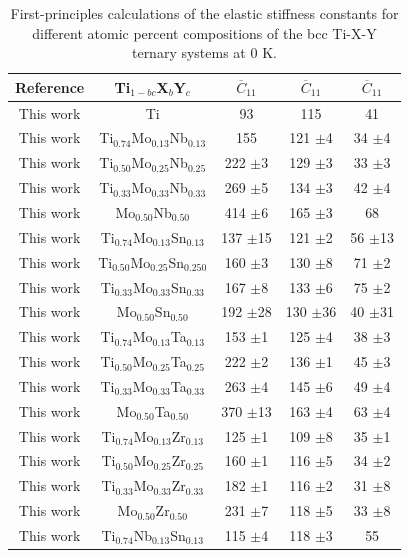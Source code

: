 \newpage
\begin{longtable}[H]{ c c c c c}
	\caption{First-principles calculations of the elastic stiffness constants for different atomic percent compositions of the bcc Ti-X-Y ternary systems at 0 K.} 	\label{Ch6-table:tixyecijdata} \\
	\hline
	Reference & Ti$_{1-bc}$X$_b$Y$_c$ & $\overline{C}_{11}$ & $\overline{C}_{11}$ & $\overline{C}_{11}$ \\
	\hline
	\endhead
	\hline
	\endfoot
	This work & Ti & 93 & 115 & 41 \\
	This work & Ti$_{0.74}$Mo$_{0.13}$Nb$_{0.13}$ & 155 & 121 $\pm$4 & 34 $\pm$4 \\
	This work & Ti$_{0.50}$Mo$_{0.25}$Nb$_{0.25}$ & 222 $\pm$3 & 129 $\pm$3 & 33 $\pm$3 \\
	This work & Ti$_{0.33}$Mo$_{0.33}$Nb$_{0.33}$ & 269 $\pm$5 & 134 $\pm$3 & 42 $\pm$4 \\
	This work & Mo$_{0.50}$Nb$_{0.50}$ & 414 $\pm$6 & 165 $\pm$3 & 68 \\
	This work & Ti$_{0.74}$Mo$_{0.13}$Sn$_{0.13}$ & 137 $\pm$15 & 121 $\pm$2 & 56 $\pm$13 \\
	This work & Ti$_{0.50}$Mo$_{0.25}$Sn$_{0.250}$ & 160 $\pm$3 & 130 $\pm$8 & 71 $\pm$2 \\
	This work & Ti$_{0.33}$Mo$_{0.33}$Sn$_{0.33}$ & 167 $\pm$8 & 133 $\pm$6 & 75 $\pm$2 \\
	This work & Mo$_{0.50}$Sn$_{0.50}$ & 192 $\pm$28 & 130 $\pm$36 & 40 $\pm$31 \\
	This work & Ti$_{0.74}$Mo$_{0.13}$Ta$_{0.13}$ & 153 $\pm$1 & 125 $\pm$4 & 38 $\pm$3 \\
	This work & Ti$_{0.50}$Mo$_{0.25}$Ta$_{0.25}$ & 222 $\pm$2 & 136 $\pm$1 & 45 $\pm$3 \\
	This work & Ti$_{0.33}$Mo$_{0.33}$Ta$_{0.33}$ & 263 $\pm$4 & 145 $\pm$6 & 49 $\pm$4 \\
	This work & Mo$_{0.50}$Ta$_{0.50}$ & 370 $\pm$13 & 163 $\pm$4 & 63 $\pm$4 \\
	This work & Ti$_{0.74}$Mo$_{0.13}$Zr$_{0.13}$ & 125 $\pm$1 & 109 $\pm$8 & 35 $\pm$1 \\
	This work & Ti$_{0.50}$Mo$_{0.25}$Zr$_{0.25}$ & 160 $\pm$1 & 116 $\pm$5 & 34 $\pm$2 \\
	This work & Ti$_{0.33}$Mo$_{0.33}$Zr$_{0.33}$ & 182 $\pm$1 & 116 $\pm$2 & 31 $\pm$8 \\
	This work & Mo$_{0.50}$Zr$_{0.50}$ & 231 $\pm$7 & 118 $\pm$5 & 33 $\pm$8 \\
	This work & Ti$_{0.74}$Nb$_{0.13}$Sn$_{0.13}$ & 115 $\pm$4 & 118 $\pm$3 & 55 \\

\end{longtable}
